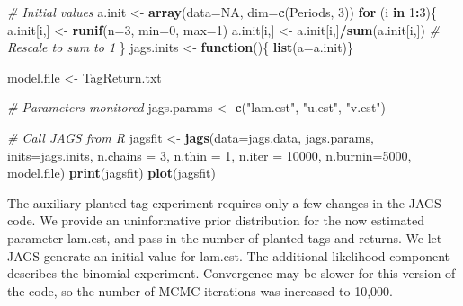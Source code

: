 \documentclass[
]{krantz}
\makeatletter
\newenvironment{Shaded}{\begin{snugshade}}{\end{snugshade}}
\newcommand{\AttributeTok}[1]{\textcolor[rgb]{0.27,0.27,0.27}{#1}}
\newcommand{\CommentTok}[1]{\textcolor[rgb]{0.37,0.37,0.37}{\textit{#1}}}
\newcommand{\ConstantTok}[1]{\textcolor[rgb]{0.37,0.37,0.37}{#1}}
\newcommand{\ControlFlowTok}[1]{\textcolor[rgb]{0.27,0.27,0.27}{\textbf{#1}}}
\newcommand{\DecValTok}[1]{\textcolor[rgb]{0.06,0.06,0.06}{#1}}
\newcommand{\FunctionTok}[1]{\textcolor[rgb]{0.27,0.27,0.27}{\textbf{#1}}}
\newcommand{\NormalTok}[1]{#1}
\newcommand{\OtherTok}[1]{\textcolor[rgb]{0.37,0.37,0.37}{#1}}
\newcommand{\SpecialCharTok}[1]{\textcolor[rgb]{0.43,0.43,0.43}{\textbf{#1}}}
\newcommand{\StringTok}[1]{\textcolor[rgb]{0.5,0.5,0.5}{#1}}
\newenvironment{kframe}{%
\medskip{}
\setlength{\fboxsep}{.8em}
 \def\at@end@of@kframe{}%
 \ifinner\ifhmode%
  \def\at@end@of@kframe{\end{minipage}}%
  \begin{minipage}{\columnwidth}%
 \fi\fi%
 \def\FrameCommand##1{\hskip\@totalleftmargin \hskip-\fboxsep
 \colorbox{shadecolor}{##1}\hskip-\fboxsep
     \hskip-\linewidth \hskip-\@totalleftmargin \hskip\columnwidth}%
 \MakeFramed {\advance\hsize-\width
   \@totalleftmargin\z@ \linewidth\hsize
   \@setminipage}}%
 {\par\unskip\endMakeFramed%
 \at@end@of@kframe}
\renewenvironment{Shaded}{\begin{kframe}}{\end{kframe}}
\makeatother
\begin{document}
\begin{Shaded}
\begin{Highlighting}[]
\CommentTok{\# Initial values}
\NormalTok{  a.init }\OtherTok{\textless{}{-}} \FunctionTok{array}\NormalTok{(}\AttributeTok{data=}\ConstantTok{NA}\NormalTok{, }\AttributeTok{dim=}\FunctionTok{c}\NormalTok{(Periods, }\DecValTok{3}\NormalTok{))}
  \ControlFlowTok{for}\NormalTok{ (i }\ControlFlowTok{in} \DecValTok{1}\SpecialCharTok{:}\DecValTok{3}\NormalTok{)\{}
\NormalTok{    a.init[i,] }\OtherTok{\textless{}{-}} \FunctionTok{runif}\NormalTok{(}\AttributeTok{n=}\DecValTok{3}\NormalTok{, }\AttributeTok{min=}\DecValTok{0}\NormalTok{, }\AttributeTok{max=}\DecValTok{1}\NormalTok{)}
\NormalTok{    a.init[i,] }\OtherTok{\textless{}{-}}\NormalTok{ a.init[i,]}\SpecialCharTok{/}\FunctionTok{sum}\NormalTok{(a.init[i,])  }\CommentTok{\# Rescale to sum to 1}
\NormalTok{  \}}
\NormalTok{  jags.inits }\OtherTok{\textless{}{-}} \ControlFlowTok{function}\NormalTok{()\{ }\FunctionTok{list}\NormalTok{(}\AttributeTok{a=}\NormalTok{a.init)\}}

\NormalTok{  model.file }\OtherTok{\textless{}{-}} \StringTok{\textquotesingle{}TagReturn.txt\textquotesingle{}}

  \CommentTok{\# Parameters monitored}
\NormalTok{  jags.params }\OtherTok{\textless{}{-}} \FunctionTok{c}\NormalTok{(}\StringTok{"lam.est"}\NormalTok{, }\StringTok{"u.est"}\NormalTok{, }\StringTok{"v.est"}\NormalTok{)}

   \CommentTok{\# Call JAGS from R}
\NormalTok{  jagsfit }\OtherTok{\textless{}{-}} \FunctionTok{jags}\NormalTok{(}\AttributeTok{data=}\NormalTok{jags.data, jags.params, }\AttributeTok{inits=}\NormalTok{jags.inits,}
                  \AttributeTok{n.chains =} \DecValTok{3}\NormalTok{, }\AttributeTok{n.thin =} \DecValTok{1}\NormalTok{, }\AttributeTok{n.iter =} \DecValTok{10000}\NormalTok{, }
                  \AttributeTok{n.burnin=}\DecValTok{5000}\NormalTok{, model.file)}
  \FunctionTok{print}\NormalTok{(jagsfit)}
  \FunctionTok{plot}\NormalTok{(jagsfit)}
\end{Highlighting}
\end{Shaded}

The auxiliary planted tag experiment requires only a few changes in the JAGS code. We provide an uninformative prior distribution for the now estimated parameter lam.est, and pass in the number of planted tags and returns. We let JAGS generate an initial value for lam.est. The additional likelihood component describes the binomial experiment. Convergence may be slower for this version of the code, so the number of MCMC iterations was increased to 10,000.
\end{document}
